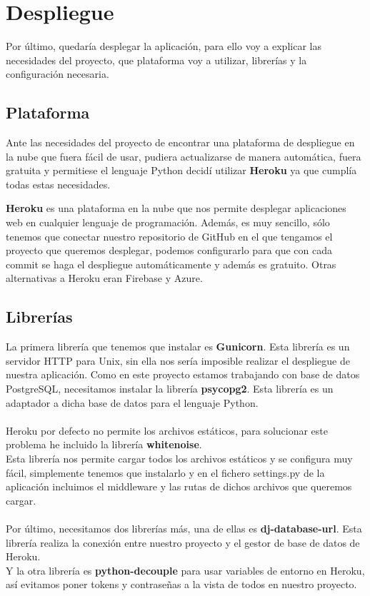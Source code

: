 \section{Despliegue} \label{sec:despliegue}

Por último, quedaría desplegar la aplicación, para ello voy a explicar las necesidades del proyecto, que plataforma voy a utilizar, librerías y la configuración necesaria.\\

\subsection{Plataforma}

Ante las necesidades del proyecto de encontrar una plataforma de despliegue en la nube que fuera fácil de usar, pudiera actualizarse de manera automática, fuera gratuita y permitiese el lenguaje Python decidí utilizar \textbf{Heroku} ya que cumplía todas estas necesidades. 

\textbf{Heroku} es una plataforma en la nube que nos permite desplegar aplicaciones web en cualquier lenguaje de programación.
Además, es muy sencillo, sólo tenemos que conectar nuestro repositorio de GitHub en el que tengamos el proyecto que queremos desplegar,
podemos configurarlo para que con cada commit se haga el despliegue automáticamente y además es gratuito. Otras alternativas a Heroku 
eran Firebase y Azure.

\subsection{Librerías}

La primera librería que tenemos que instalar es \textbf{Gunicorn}. Esta librería es un servidor HTTP para Unix, sin ella nos sería imposible realizar el despliegue de nuestra aplicación.
Como en este proyecto estamos trabajando con base de datos PostgreSQL, necesitamos instalar la librería \textbf{psycopg2}. Esta librería es un adaptador a dicha base de datos para el lenguaje Python.\\\\
Heroku por defecto no permite los archivos estáticos, para solucionar este problema he incluido la librería \textbf{whitenoise}.\\
Esta librería nos permite cargar todos los archivos estáticos y se configura muy fácil, simplemente tenemos que instalarlo y en
el fichero settings.py de la aplicación incluimos el middleware y las rutas de dichos archivos que queremos cargar.\\\\
Por último, necesitamos dos librerías más, una de ellas es \textbf{dj-database-url}. Esta librería realiza la conexión entre nuestro proyecto y el gestor de base de datos de Heroku.\\
Y la otra librería es \textbf{python-decouple} para usar variables de entorno en Heroku, así evitamos poner tokens y contraseñas a la vista de todos en nuestro proyecto. \\

